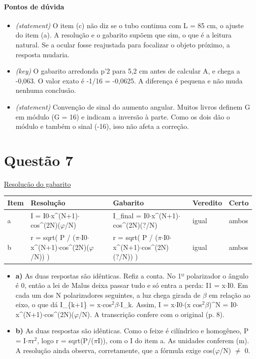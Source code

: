 \documentclass{article}%
\begin{document}
\paragraph{Pontos de dúvida}%
\begin{itemize}%
\item%
\textit{(statement)} O item (c) não diz se o tubo continua com L = 85 cm, o ajuste do item (a). A resolução e o gabarito supõem que sim, o que é a leitura natural. Se a ocular fosse reajustada para focalizar o objeto próximo, a resposta mudaria.%
\item%
\textit{(key)} O gabarito arredonda p'2 para 5,2 cm antes de calcular A, e chega a -0,063. O valor exato é -1/16 = -0,0625. A diferença é pequena e não muda nenhuma conclusão.%
\item%
\textit{(statement)} Convenção de sinal do aumento angular. Muitos livros definem G em módulo (G = 16) e indicam a inversão à parte. Como os dois dão o módulo e também o sinal (-16), isso não afeta a correção.%
\end{itemize}%
\section*{Questão 7}%
\href{https://poliedroresolve.sistemapoliedro.com.br/vestibulares/ita/2026/ita-2-fase-dia-3-30-10-2025-2-fase-dia-3/dissertativa-7-fisica-2-fase-dia-3-ita-2026}{Resolução do gabarito}\par\smallskip%
\begin{longtable}{@{}p{} p{} p{} p{} p{}@{}}\toprule Item & Resolução & Gabarito & Veredito & Certo \\ \midrule
a & I = I0$\cdot$x\^{}(N+1)$\cdot$cos\^{}(2N)($\varphi$/N) & I\_final = I0$\cdot$x\^{}(N+1)$\cdot$cos\^{}(2N)(?/N) & igual & ambos \\
b & r = sqrt( P / ($\pi$$\cdot$I0$\cdot$x\^{}(N+1)$\cdot$cos\^{}(2N)($\varphi$/N)) ) & r = sqrt( P / ($\pi$$\cdot$I0$\cdot$x\^{}(N+1)$\cdot$cos\^{}(2N)(?/N)) ) & igual & ambos \\
\bottomrule\end{longtable}%
\begin{itemize}%
\item%
\textbf{a)} As duas respostas são idênticas. Refiz a conta. No 1º polarizador o ângulo é 0, então a lei de Malus deixa passar tudo e só entra a perda: I1 = x$\cdot$I0. Em cada um dos N polarizadores seguintes, a luz chega girada de $\beta$ em relação ao eixo, o que dá I\_\{k+1\} = x$\cdot$cos$^2$$\beta$$\cdot$I\_k. Assim, I = x$\cdot$I0$\cdot$(x cos$^2$$\beta$)\^{}N = I0$\cdot$x\^{}(N+1)$\cdot$cos\^{}(2N)($\varphi$/N). A transcrição confere com o original (p. 8).%
\item%
\textbf{b)} As duas respostas são idênticas. Como o feixe é cilíndrico e homogêneo, P = I$\cdot$$\pi$r$^2$, logo r = sqrt(P/($\pi$I)), com o I do item a. As unidades conferem (m). A resolução ainda observa, corretamente, que a fórmula exige cos($\varphi$/N) $\neq$ 0.%
\end{itemize}%
\end{document}
